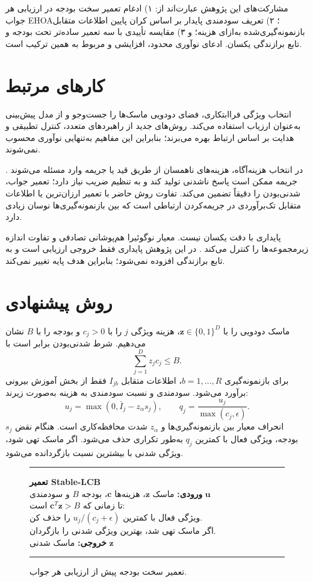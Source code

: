 \documentclass[10pt,journal,a4paper]{IEEEtran}
\newcommand{\lr}[1]{\foreignlanguage{english}{#1}}
\begin{document}
مشارکت‌های این پژوهش عبارت‌اند از: ۱) ادغام تعمیر سخت بودجه در ارزیابی هر جواب \lr{EHOA}؛ ۲) تعریف سودمندی پایدار بر اساس کران پایین اطلاعات متقابل بازنمونه‌گیری‌شده به‌ازای هزینه؛ و ۳) مقایسه تأییدی با سه تعمیر ساده‌تر تحت بودجه و تابع برازندگی یکسان. ادعای نوآوری محدود، افزایشی و مربوط به همین ترکیب است.

\section{کارهای مرتبط}
انتخاب ویژگی فراابتکاری، فضای دودویی ماسک‌ها را جست‌وجو و از مدل پیش‌بینی به‌عنوان ارزیاب استفاده می‌کند. روش‌های جدید از راهبردهای متعدد، کنترل تطبیقی و هدایت بر اساس ارتباط بهره می‌برند؛ بنابراین این مفاهیم به‌تنهایی نوآوری محسوب نمی‌شوند.

در انتخاب هزینه‌آگاه، هزینه‌های ناهمسان از طریق قید یا جریمه وارد مسئله می‌شوند \cite{jagdhuber2020}. جریمه ممکن است پاسخ ناشدنی تولید کند و به تنظیم ضریب نیاز دارد؛ تعمیر جواب، شدنی‌بودن را دقیقاً تضمین می‌کند. تفاوت روش حاضر با تعمیر ارزان‌ترین یا اطلاعات متقابل تک‌برآوردی در جریمه‌کردن ارتباطی است که بین بازنمونه‌گیری‌ها نوسان زیادی دارد.

پایداری با دقت یکسان نیست. معیار نوگوئیرا هم‌پوشانی تصادفی و تفاوت اندازه زیرمجموعه‌ها را کنترل می‌کند \cite{nogueira2018}. در این پژوهش پایداری فقط خروجی ارزیابی است و به تابع برازندگی افزوده نمی‌شود؛ بنابراین هدف پایه تغییر نمی‌کند.

\section{روش پیشنهادی}
ماسک دودویی را با $\mathbf z\in\{0,1\}^D$، هزینه ویژگی $j$ را با $c_j>0$ و بودجه را با $B$ نشان می‌دهیم. شرط شدنی‌بودن برابر است با
\begin{equation}\sum_{j=1}^{D}z_jc_j\le B.\end{equation}
برای بازنمونه‌گیری $b=1,\ldots,R$، اطلاعات متقابل $I_{jb}$ فقط از بخش آموزش بیرونی برآورد می‌شود. سودمندی و نسبت سودمندی به هزینه به‌صورت زیرند:
\begin{equation}u_j=\max(0,\bar I_j-z_{\alpha}s_j),\qquad q_j=\frac{u_j}{\max(c_j,\epsilon)}.\end{equation}
$s_j$ انحراف معیار بین بازنمونه‌گیری‌ها و $z_{\alpha}$ شدت محافظه‌کاری است. هنگام نقض بودجه، ویژگی فعال با کمترین $q_j$ به‌طور تکراری حذف می‌شود. اگر ماسک تهی شود، ویژگی شدنی با بیشترین نسبت بازگردانده می‌شود.

\begin{figure}[t]
\small\hrule\vspace{3pt}
\textbf{تعمیر \lr{Stable-LCB}}\\
\textbf{ورودی:} ماسک $\mathbf z$، هزینه‌ها $\mathbf c$، بودجه $B$ و سودمندی $\mathbf u$\\
تا زمانی که $\mathbf c^T\mathbf z>B$ است:\\
ویژگی فعال با کمترین $u_j/(c_j+\epsilon)$ را حذف کن.\\
اگر ماسک تهی شد، بهترین ویژگی شدنی را بازگردان.\\
\textbf{خروجی:} ماسک شدنی $\mathbf z$
\vspace{3pt}\hrule
\caption{تعمیر سخت بودجه پیش از ارزیابی هر جواب.}
\end{figure}
\end{document}
